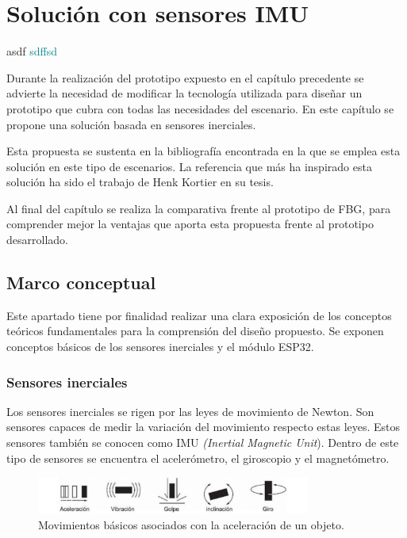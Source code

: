 \chapter{Solución con sensores IMU\label{sec:IMU}}

\textcolor{rositaoscuro}{asdf}
\textcolor{teal}{sdffsd}

\label{sec:IMU4}

Durante la realización del prototipo expuesto en el capítulo precedente se advierte la necesidad de modificar la tecnología utilizada para diseñar un prototipo que cubra con todas las necesidades del escenario. En este capítulo se propone una solución basada en sensores inerciales. 

Esta propuesta se sustenta en la bibliografía encontrada en la que se emplea esta solución en este tipo de escenarios. La referencia que más ha inspirado esta solución ha sido el trabajo de Henk Kortier en su tesis. \cite{Kortier} 

Al final del capítulo se realiza la comparativa frente al prototipo de FBG, para comprender mejor la ventajas que aporta esta propuesta frente al prototipo desarrollado. 

\section{Marco conceptual}
\label{sec:marco4}

Este apartado tiene por finalidad realizar una clara exposición de los conceptos teóricos fundamentales para la comprensión del diseño propuesto. Se exponen conceptos básicos de los sensores inerciales y el módulo ESP32.  


\subsection{Sensores inerciales}
\label{sec:asdf4}

Los sensores inerciales se rigen por las leyes de movimiento de Newton. Son sensores capaces de medir la variación del movimiento respecto estas leyes. Estos sensores también se conocen como IMU \textit{(Inertial Magnetic Unit}).
Dentro de este tipo de sensores se encuentra el acelerómetro, el giroscopio y el magnetómetro.

\begin{figure}[H]
	\centering
	\includegraphics[width=0.8\textwidth]{./img/movimientoAcelera}
	\caption{Movimientos básicos asociados con la aceleración de un objeto. \cite{juanDiego}} 
	\label{fig:movimientosAcelera}
\end{figure} 


